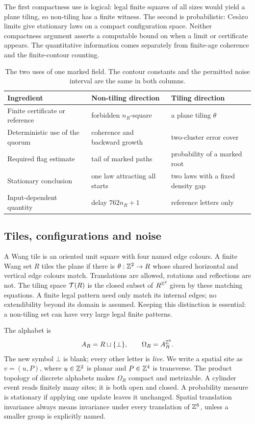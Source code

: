 The first compactness use is logical: legal finite squares of all sizes would yield a plane tiling, so non-tiling has a finite witness. The second is probabilistic: Ces\`aro limits give stationary laws on a compact configuration space. Neither compactness argument asserts a computable bound on when a limit or certificate appears. The quantitative information comes separately from finite-age coherence and the finite-contour counting.

\begin{table}[ht]
\centering\small
\begin{tabularx}{\textwidth}{@{}>{\raggedright\arraybackslash}p{3.1cm}>{\raggedright\arraybackslash}X>{\raggedright\arraybackslash}X@{}}
\toprule
Ingredient & Non-tiling direction & Tiling direction\\
\midrule
Finite certificate or reference & forbidden $n_R$-square & a plane tiling $\theta$\\
Deterministic use of the quorum & coherence and backward growth & two-cluster error cover\\
Required flag estimate & tail of marked paths & probability of a marked root\\
Stationary conclusion & one law attracting all starts & two laws with a fixed density gap\\
Input-dependent quantity & delay $762n_R+1$ & reference letters only\\
\bottomrule
\end{tabularx}
\caption{The two uses of one marked field. The contour constants and the permitted noise interval are the same in both columns.}
\end{table}
\subsection{Tiles, configurations and noise}

A Wang tile is an oriented unit square with four named edge colours. A finite Wang set $R$ tiles the plane if there is $\theta:\mathbb{Z}^2\to R$ whose shared horizontal and vertical edge colours match. Translations are allowed, rotations and reflections are not. The tiling space $\mathcal T(R)$ is the closed subset of $R^{\mathbb{Z}^2}$ given by these matching equations. A finite legal pattern need only match its internal edges; no extendibility beyond its domain is assumed. Keeping this distinction is essential: a non-tiling set can have very large legal finite patterns.

The alphabet is
\[
 A_R=R\sqcup\{\bot\},\qquad \Omega_R=A_R^{\mathbb{Z}^6}.
\]
The new symbol $\bot$ is blank; every other letter is \emph{live}. We write a spatial site as $v=(u,P)$, where $u\in\mathbb{Z}^2$ is planar and $P\in\mathbb{Z}^4$ is transverse. The product topology of discrete alphabets makes $\Omega_R$ compact and metrizable. A cylinder event reads finitely many sites; it is both open and closed. A probability measure is stationary if applying one update leaves it unchanged. Spatial translation invariance always means invariance under every translation of $\mathbb{Z}^6$, unless a smaller group is explicitly named.

